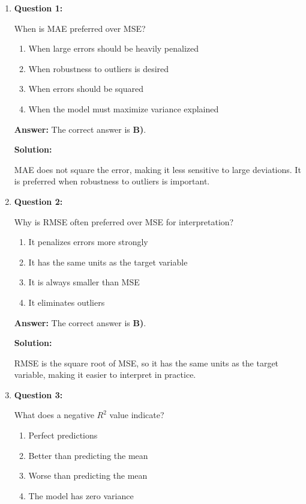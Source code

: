 \documentclass{article}
\begin{document}
\begin{enumerate}

\item \textbf{Question 1:}

When is MAE preferred over MSE?

\begin{enumerate}
    \item When large errors should be heavily penalized
    \item When robustness to outliers is desired
    \item When errors should be squared
    \item When the model must maximize variance explained
\end{enumerate}

\textbf{Answer:} The correct answer is \textbf{B)}.

\textbf{Solution:}

MAE does not square the error, making it less sensitive to large deviations.  
It is preferred when robustness to outliers is important.

\vspace{6pt}

\item \textbf{Question 2:}

Why is RMSE often preferred over MSE for interpretation?

\begin{enumerate}
    \item It penalizes errors more strongly
    \item It has the same units as the target variable
    \item It is always smaller than MSE
    \item It eliminates outliers
\end{enumerate}

\textbf{Answer:} The correct answer is \textbf{B)}.

\textbf{Solution:}

RMSE is the square root of MSE, so it has the same units as the target variable, making it easier to interpret in practice.

\vspace{6pt}

\item \textbf{Question 3:}

What does a negative $R^2$ value indicate?

\begin{enumerate}
    \item Perfect predictions
    \item Better than predicting the mean
    \item Worse than predicting the mean
    \item The model has zero variance
\end{enumerate}


\end{enumerate}
\end{document}
